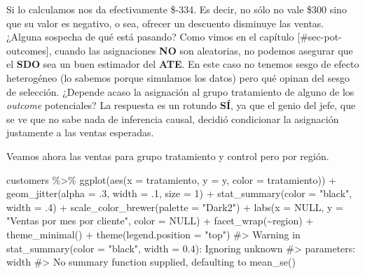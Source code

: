 \documentclass[
  letterpaper,
  DIV=11,
  numbers=noendperiod,
  oneside]{scrreprt}
\newenvironment{Shaded}{\begin{snugshade}}{\end{snugshade}}
\newcommand{\AttributeTok}[1]{\textcolor[rgb]{0.40,0.45,0.13}{#1}}
\newcommand{\CommentTok}[1]{\textcolor[rgb]{0.37,0.37,0.37}{#1}}
\newcommand{\ConstantTok}[1]{\textcolor[rgb]{0.56,0.35,0.01}{#1}}
\newcommand{\DecValTok}[1]{\textcolor[rgb]{0.68,0.00,0.00}{#1}}
\newcommand{\FunctionTok}[1]{\textcolor[rgb]{0.28,0.35,0.67}{#1}}
\newcommand{\NormalTok}[1]{\textcolor[rgb]{0.00,0.23,0.31}{#1}}
\newcommand{\SpecialCharTok}[1]{\textcolor[rgb]{0.37,0.37,0.37}{#1}}
\newcommand{\StringTok}[1]{\textcolor[rgb]{0.13,0.47,0.30}{#1}}
\begin{document}
Si lo calculamos nos da efectivamente \$-334. Es decir, no sólo no vale
\$\(300\) sino que su valor es negativo, o sea, ofrecer un descuento
disminuye las ventas. ¿Alguna sospecha de qué está pasando? Como vimos
en el capítulo {[}\#sec-pot-outcomes{]}, cuando las asignaciones
\textbf{NO} son aleatorias, no podemos asegurar que el \textbf{SDO} sea
un buen estimador del \textbf{ATE}. En este caso no tenemos sesgo de
efecto heterogéneo (lo sabemos porque simulamos los datos) pero qué
opinan del sesgo de selección. ¿Depende acaso la asignación al grupo
tratamiento de alguno de los \emph{outcome} potenciales? La respuesta es
un rotundo \textbf{SÍ}, ya que el genio del jefe, que se ve que no sabe
nada de inferencia causal, decidió condicionar la asignación justamente
a las ventas esperadas.

Veamos ahora las ventas para grupo tratamiento y control pero por
región.

\begin{Shaded}
\begin{Highlighting}[]
\NormalTok{customers }\SpecialCharTok{\%\textgreater{}\%}
  \FunctionTok{ggplot}\NormalTok{(}\FunctionTok{aes}\NormalTok{(}\AttributeTok{x =}\NormalTok{ tratamiento, }
             \AttributeTok{y =}\NormalTok{ y, }
             \AttributeTok{color =}\NormalTok{ tratamiento)) }\SpecialCharTok{+}
  \FunctionTok{geom\_jitter}\NormalTok{(}\AttributeTok{alpha =}\NormalTok{ .}\DecValTok{3}\NormalTok{, }\AttributeTok{width =}\NormalTok{ .}\DecValTok{1}\NormalTok{, }\AttributeTok{size =} \DecValTok{1}\NormalTok{) }\SpecialCharTok{+} 
  \FunctionTok{stat\_summary}\NormalTok{(}\AttributeTok{color =} \StringTok{"black"}\NormalTok{, }\AttributeTok{width =}\NormalTok{ .}\DecValTok{4}\NormalTok{) }\SpecialCharTok{+}
  \FunctionTok{scale\_color\_brewer}\NormalTok{(}\AttributeTok{palette =} \StringTok{"Dark2"}\NormalTok{) }\SpecialCharTok{+}
  \FunctionTok{labs}\NormalTok{(}\AttributeTok{x =} \ConstantTok{NULL}\NormalTok{, }\AttributeTok{y =} \StringTok{"Ventas por mes por cliente"}\NormalTok{, }\AttributeTok{color =} \ConstantTok{NULL}\NormalTok{) }\SpecialCharTok{+}
  \FunctionTok{facet\_wrap}\NormalTok{(}\SpecialCharTok{\textasciitilde{}}\NormalTok{region) }\SpecialCharTok{+}
  \FunctionTok{theme\_minimal}\NormalTok{() }\SpecialCharTok{+}
  \FunctionTok{theme}\NormalTok{(}\AttributeTok{legend.position =} \StringTok{"top"}\NormalTok{)}
\CommentTok{\#\textgreater{} Warning in stat\_summary(color = "black", width = 0.4): Ignoring unknown}
\CommentTok{\#\textgreater{} parameters: \textasciigrave{}width\textasciigrave{}}
\CommentTok{\#\textgreater{} No summary function supplied, defaulting to \textasciigrave{}mean\_se()\textasciigrave{}}
\end{Highlighting}
\end{Shaded}
\end{document}
